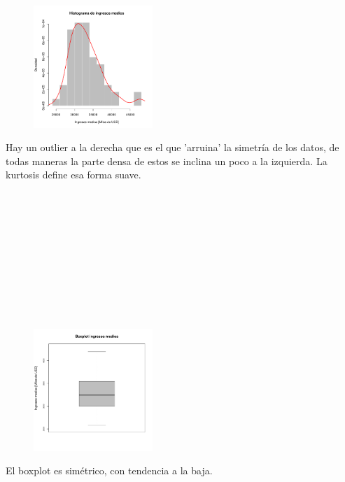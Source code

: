 \documentclass[11pt]{article}
\begin{document}
\begin{figure}
    \centering
    \includegraphics[width = 0.4\textwidth]{histim}
\end{figure}

Hay un outlier a la  derecha que es el que 'arruina' la simetría de los datos, de todas maneras la parte densa de estos se inclina un poco a la izquierda. La kurtosis define esa forma suave.
\\
\\
\\
\\
\\
\\
\\
\\
\\
\\
\\
\begin{figure}
    \centering
    \includegraphics[width = 0.4\textwidth]{boxim}
\end{figure}

El boxplot es simétrico, con tendencia a la baja.
\\
\\
\\
\\
\\
\\
\\
\\
\\
\\
\\
\\
\\
\\
\end{document}
